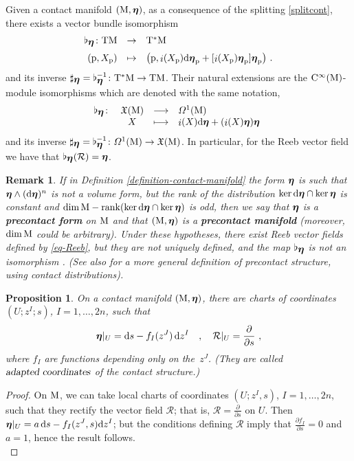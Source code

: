 \documentclass[12pt]{report}
\newtheorem{prop}[teor]{Proposition}
\newtheorem{remark}[teor]{Remark}
\def\beq{\begin{equation}}
\def\eeq{\end{equation}}
\def\derpar#1#2{\frac{\partial{#1}}{\partial{#2}}}
\def\qed{\ifvmode\removelastskip\fi
{\unskip\nobreak\hfil\penalty50\hbox{}\nobreak\hfil
\hbox{\vrule height1.2ex width1.2ex}\parfillskip=0pt
\finalhyphendemerits=0 \par\smallskip}}
\def\vf{\mathfrak X}
\def\df{{\mit\Omega}}
\def\d{{\rm d}}
\def\bmeta{\mbox{\boldmath $\eta$}}
\def\Tan{{\rm T}}
\def\inn{\mathop{i}\nolimits}
\def\Cinfty{{\rm C}^\infty}
\newcommand{\Reeb}{\mathcal{R}}
\begin{document}
Given a contact manifold $({\rm M},\bmeta)$, as a consequence of the splitting \eqref{splitcont}, there exists a vector bundle isomorphism
$$
    \begin{array}{rcl}
        \flat_{\bmeta}\colon \Tan {\rm M} & \to & \Tan^*{\rm M}\\ \noalign{\medskip}
       ({\rm p},X_{\rm p}) & \mapsto & 
\big({\rm p},\inn(X_{\rm p})\d\bmeta_{\rm p} + [\inn(X_{\rm p})\bmeta_{\rm p}]\bmeta_{\rm p}\big)\ .
    \end{array}
$$
and its inverse $\sharp_{\bmeta}=\flat_{\bmeta}^{-1}\colon \Tan^*{\rm M} \to \Tan {\rm M}$.
Their natural extensions are the $\Cinfty({\rm M})$-module isomorphisms
which are denoted with the same notation,
\beq
\begin{array}{rccl}
   \flat_{\bmeta}\colon & \vf({\rm M}) & \longrightarrow & \df^1({\rm M}) \\
   & X & \longmapsto & \inn(X)\d\bmeta+(\inn(X)\bmeta)\bmeta
\end{array} \ 
\label{isocont}
\eeq
and its inverse $\sharp_{\bmeta}=\flat_{\bmeta}^{-1}\colon \df^1({\rm M})\to \vf({\rm M})$.
In particular, for the Reeb vector field
we have that $\flat_{\bmeta}(\Reeb)=\bmeta$.

\begin{remark}
\label{nocontacto}{\rm
If in Definition \ref{definition-contact-manifold} the form $\bmeta$ is such that
$\bmeta\wedge(\d\bmeta)^{n}$ is not a volume form, 
but the rank of the distribution $\ker\d\bmeta\cap\ker\bmeta$ is constant 
and $\dim{\rm M}-{\rm rank}(\ker\d\bmeta\cap\ker\bmeta)$ is odd,
then we say that $\bmeta$ is a {\sl \textbf{precontact form}} on ${\rm M}$
and that $({\rm M},\bmeta)$ is a {\sl \textbf{precontact manifold}}
(moreover, ${\rm dim}\,{\rm M}$ could be arbitrary).
Under these hypotheses, there exist Reeb vector fields defined by \eqref{eq-Reeb}, but they are not uniquely defined,
and the map $\flat_{\bmeta}$ is not an isomorphism \cite{LGGMR-2023}.
(See also \cite{GG-2023} for a more general definition of precontact structure,
using {\sl contact distributions\/}).
}\end{remark}

\begin{prop}\label{prop-adapted-coord}
On a contact manifold $({\rm M},\bmeta)$, there are charts of coordinates $(U;z^I;s)$, $I=1,\ldots,2n$,
such that
$$
\bmeta\vert_U = \d s - f_I(z^J) \,\d z^I 
\quad ,\quad
\Reeb\vert_U = \frac{\partial}{\partial s}\ ,
$$
where $f_I$ are functions depending only on the~$z^J$.
(They are called $\textsl{adapted coordinates}$ of the contact structure.)
\end{prop}
\begin{proof}
On ${\rm M}$, we can take local charts of coordinates $(U;z^I,s)$, $I=1,\ldots,2n$, such that they rectify the vector field $\Reeb$; that is, $\Reeb=\displaystyle\derpar{}{s}$ on $U$.
Then $\displaystyle\bmeta\vert_U=a\,\d s-f_I(z^J,s)\d z^I$; but the conditions defining $\Reeb$ imply that  $\displaystyle\derpar{f_I}{s}=0$ and $a=1$, hence the result follows.
\\ \qed \end{proof}
\end{document}
